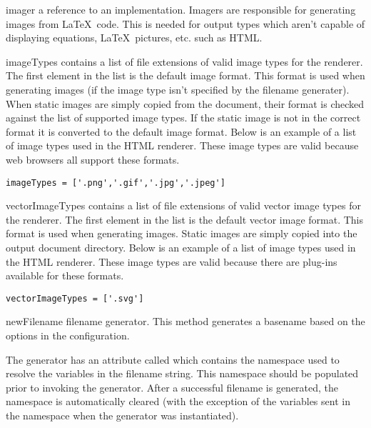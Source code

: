 \begin{memberdesc}[Renderer]{imager}
a reference to an  implementation.  Imagers are responsible
for generating images from \LaTeX\ code.  This is needed for output types 
which aren't capable of displaying equations, \LaTeX\ pictures, etc. such
as HTML.
\end{memberdesc}

\begin{memberdesc}[Renderer]{imageTypes}
contains a list of file extensions of valid image types for the renderer.
The first element in the list is the default image format.  This format
is used when generating images (if the image type isn't specified by
the filename generater).  When static images are simply copied from
the document, their format is checked against the list of supported image
types.  If the static image is not in the correct format it is converted
to the default image format.  Below is an example of a list of image
types used in the HTML renderer.  These image types are valid because 
web browsers all support these formats.
\begin{verbatim}
imageTypes = ['.png','.gif','.jpg','.jpeg']
\end{verbatim}
\end{memberdesc}

\begin{memberdesc}[Renderer]{vectorImageTypes}
contains a list of file extensions of valid vector image types for the
renderer.  The first element in the list is the default vector image 
format.  This format is used when generating images.  Static images
are simply copied into the output document directory.  Below is an
example of a list of image types used in the HTML renderer.  These
image types are valid because there are plug-ins available for these
formats.
\begin{verbatim}
vectorImageTypes = ['.svg']
\end{verbatim}
\end{memberdesc}

\begin{memberdesc}[Renderer]{newFilename}
filename generator.  This method generates a basename based on the options
in the configuration.  

The generator has an attribute called  which contains the
namespace used to resolve the variables in the filename string.  This
namespace should be populated prior to invoking the generator.  After
a successful filename is generated, the namespace is automatically cleared
(with the exception of the variables sent in the namespace when the 
generator was instantiated).

\end{memberdesc}

